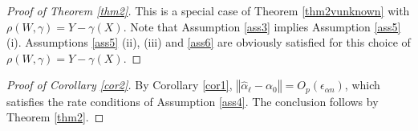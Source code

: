 \documentclass[aos]{imsart}
\numberwithin{equation}{section}
\theoremstyle{plain}
\theoremstyle{remark}
\begin{document}
\begin{appendix}
\begin{proof}[Proof of Theorem \ref{thm2}]
    This is a special case of Theorem \ref{thm2vunknown} with $\rho(W, \gamma) = Y - \gamma(X)$. Note that Assumption \ref{ass3} implies Assumption \ref{ass5} (i). Assumptions \ref{ass5} (ii), (iii) and \ref{ass6} are obviously satisfied for this choice of $\rho(W, \gamma) = Y - \gamma(X)$.
\end{proof}

\begin{proof}[Proof of Corollary \ref{cor2}]
By Corollary \ref{cor1}, $\left\Vert \hat{\alpha}_\ell - \alpha_0 \right\Vert = O_p(\epsilon_{\alpha n})$, which satisfies the rate conditions of Assumption \ref{ass4}. The conclusion follows by Theorem \ref{thm2}.
\end{proof}



\end{appendix}
\end{document}
